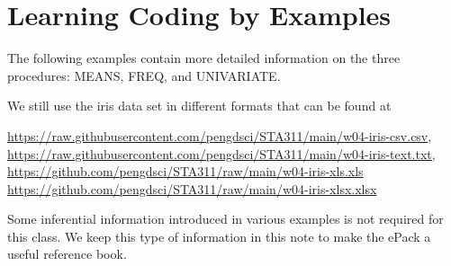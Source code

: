 \documentclass[
]{book}
\begin{document}
\hypertarget{learning-coding-by-examples-1}{%
\section{Learning Coding by Examples}\label{learning-coding-by-examples-1}}

The following examples contain more detailed information on the three procedures: MEANS, FREQ, and UNIVARIATE.

We still use the iris data set in different formats that can be found at

\url{https://raw.githubusercontent.com/pengdsci/STA311/main/w04-iris-csv.csv}, \url{https://raw.githubusercontent.com/pengdsci/STA311/main/w04-iris-text.txt},
\url{https://github.com/pengdsci/STA311/raw/main/w04-iris-xls.xls}
\url{https://github.com/pengdsci/STA311/raw/main/w04-iris-xlsx.xlsx}

Some inferential information introduced in various examples is not required for this class. We keep this type of information in this note to make the ePack a useful reference book.
\end{document}
